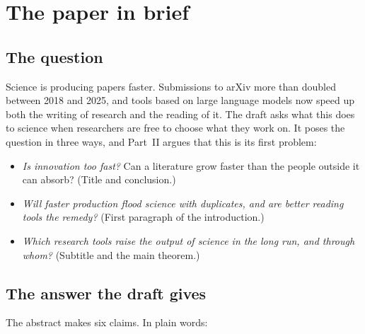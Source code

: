
\section{The paper in brief}

\subsection{The question}

Science is producing papers faster. Submissions to arXiv more than doubled between 2018 and 2025, and tools based on large language models now speed up both the writing of research and the reading of it. The draft asks what this does to science when researchers are free to choose what they work on. It poses the question in three ways, and Part~II argues that this is its first problem:

\begin{itemize}
\item \emph{Is innovation too fast?} Can a literature grow faster than the people outside it can absorb? (Title and conclusion.)
\item \emph{Will faster production flood science with duplicates, and are better reading tools the remedy?} (First paragraph of the introduction.)
\item \emph{Which research tools raise the output of science in the long run, and through whom?} (Subtitle and the main theorem.)
\end{itemize}

\subsection{The answer the draft gives}

The abstract makes six claims. In plain words:

